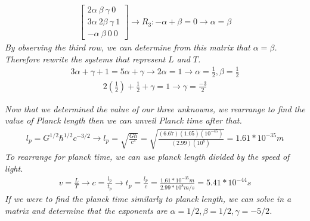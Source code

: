 \documentclass{article}
\begin{document}
{\begin{gather*}
	\begin{bmatrix}
		2\alpha 	\ \beta \ 	\gamma \ 0 \\
		3\alpha 	\ 2\beta \ 	\gamma \ 1 \\
		-\alpha 	\ \beta \ 0 \ 0 
	\end{bmatrix}
\rightarrow R_{3}: - \alpha + \beta = 0 \rightarrow \alpha = \beta
\end{gather*}
\textit{By observing the third row, we can determine from this matrix that $\alpha = \beta$.}
\textit{Therefore rewrite the systems that represent $L$ and $T$.} 
\begin{gather*}
	3\alpha + \gamma + 1 = 5\alpha + \gamma \rightarrow 2\alpha = 1 \rightarrow \alpha = \frac{1}{2} , \beta = \frac{1}{2}	
\end{gather*}
\begin{gather*}
	2(\frac{1}{2}) + \frac{1}{2} + \gamma = 1 \rightarrow \gamma = \frac{-3}{2}
\end{gather*}

\textit{Now that we determined the value of our three unknowns, we rearrange to find the value of Planck length then we can unveil Planck time after that.}
\begin{gather*}
l_{p} = G^{1/2}\hbar^{1/2}c^{-3/2} \rightarrow l_{p} = \sqrt{\frac{G\hbar}{c^3}} = \sqrt{\frac{(6.67)(1.05)(10^{-45})}{(2.99)(10^8)}} = 1.61*10^{-35}m
\end{gather*}
\textit{To rearrange for planck time, we can use planck length divided by the speed of light.}
\begin{gather*}
	v = \frac{L}{T} \rightarrow c = \frac{l_{p}}{t_{p}} \rightarrow t_{p} = \frac{l_{p}}{c} = \frac{1.61*10^{-35}m}{2.99*10^{8}m/s} = 5.41*10^{-44}s
\end{gather*}
\textit{If we were to find the planck time similarly to planck length, we can solve in a matrix and determine that the exponents are $\alpha = 1/2, \beta = 1/2, \gamma = -5/2$.}

\clearpage


}
\end{document}
